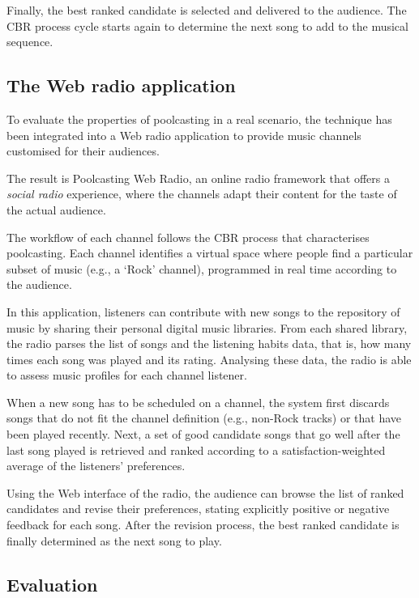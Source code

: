 Finally, the best ranked candidate is selected and delivered to the audience.
The CBR process cycle starts again to determine the next song to add to the musical sequence.



\subsection{The Web radio application} %

To evaluate the properties of poolcasting in a real scenario, the technique has been integrated into a Web radio application to provide music channels customised for their audiences.

The result is Poolcasting Web Radio, an online radio framework that offers a \emph{social radio} experience, where the channels adapt their content for the taste of the actual audience. %

The workflow of each channel follows the CBR process that characterises poolcasting.
Each channel identifies a virtual space where people find a particular subset of music (e.g., a `Rock' channel), programmed in real time according to the audience.

In this application, listeners can contribute with new songs to the repository of music by sharing their personal digital music libraries.
From each shared library, the radio parses the list of songs and the listening habits data, that is, how many times each song was played and its rating.
Analysing these data, the radio is able to assess music profiles for each channel listener.

When a new song has to be scheduled on a channel, the system first discards songs that do not fit the channel definition (e.g., non-Rock tracks) or that have been played recently.
Next, a set of good candidate songs that go well after the last song played is retrieved and ranked according to a satisfaction-weighted average of the listeners' preferences.

Using the Web interface of the radio, the audience can browse the list of ranked candidates and revise their preferences, stating explicitly positive or negative feedback for each song.
After the revision process, the best ranked candidate is finally determined as the next song to play.


\subsection{Evaluation} %
\label{sub:applications_evaluations}

